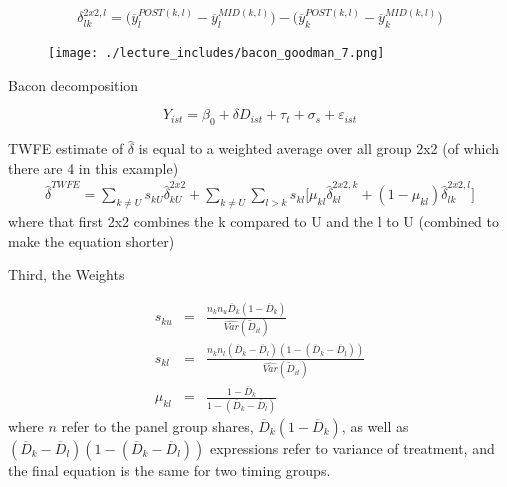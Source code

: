 \documentclass{beamer}
\begin{document}
\begin{frame}[plain]
$$\delta_{lk}^{2x2,l} = \bigg ( \overline{y}_l^{POST(k,l)} - \overline{y}_l^{MID(k,l)} \bigg ) - \bigg ( \overline{y}_k^{POST(k,l)} - \overline{y}_k^{MID(k,l)} \bigg ) $$

	\begin{figure}
	\texttt{[image: ./lecture\_includes/bacon\_goodman\_7.png]}
	\end{figure}

\end{frame}


	

\begin{frame}{Bacon decomposition}

$$Y_{ist} = \beta_0 + \delta D_{ist} + \tau_t + \sigma_s + \varepsilon_{ist}$$


TWFE estimate of $\widehat{\delta}$ is equal to a weighted average over all group 2x2 (of which there are 4 in this example)
\begin{eqnarray*}	
\widehat{\delta}^{TWFE} = \sum_{k \neq U} s_{kU}\widehat{\delta}_{kU}^{2x2} + \sum_{k \neq U} \sum_{l>k} s_{kl}  \bigg [ \mu_{kl}\widehat{\delta}_{kl}^{2x2,k} + (1-\mu_{kl}) \widehat{\delta}_{lk}^{2x2,l} \bigg]
\end{eqnarray*}where that first 2x2 combines the k compared to U and the l to U (combined to make the equation shorter)

\end{frame}
	


\begin{frame}{Third, the Weights}

 \begin{eqnarray*} s_{ku} &=& \frac{ n_k n_u \overline{D}_k (1- \overline{D}_k ) }{ \widehat{Var} ( \tilde{D}_{it} )} \\
s_{kl} &=& \frac{ n_k n_l (\overline{D}_k - \overline{D}_{l} ) ( 1- ( \overline{D}_k - \overline{D}_{l} )) }{\widehat{Var}(\tilde{D}_{it})} \\
\mu_{kl} &=& \frac{1 - \overline{D}_k }{1 - ( \overline{D}_k - \overline{D}_{l} )}
\end{eqnarray*}where $n$ refer to the panel group shares, $\overline{D}_k (1- \overline{D}_k )$, as well as $(\overline{D}_k - \overline{D}_{l} ) ( 1- ( \overline{D}_k - \overline{D}_{l} ))$ expressions refer to variance of treatment, and the final equation is the same for two timing groups.

\end{frame}
\end{document}

